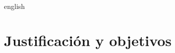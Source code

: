 \documentclass[0000.tex]{subfiles}
\begin{document}
\begin{hyphenrules}{english}
\section*{Justificación y objetivos}\label{sec:objectives}

\end{hyphenrules}

\ifSubfilesClassLoaded{}{}
\end{document}
